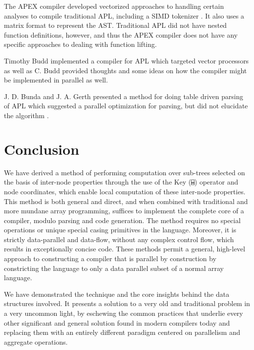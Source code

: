 ﻿\documentclass[numbers,10pt,preprint]{sigplanconf}
\begin{document}
The APEX compiler \cite{bernecky1997apex} developed vectorized approaches to handling certain analyses to compile traditional APL, including a SIMD tokenizer \cite{bernecky2003tokenizer}. It also uses a matrix format to represent the AST. Traditional APL did not have nested function definitions, however, and thus the APEX compiler does not have any specific approaches to dealing with function lifting.

Timothy Budd implemented a compiler \cite{budd1984apl,budd2012apl} for APL which targeted vector processors as well as C. Budd provided thoughts and some ideas on how the compiler might be implemented in parallel as well.

J. D. Bunda and J. A. Gerth presented a method for doing table driven parsing of APL which suggested a parallel optimization for parsing, but did not elucidate the algorithm \cite{bunda1984apl}.

\section{Conclusion}

We have derived a method of performing computation over sub-trees selected on the basis of inter-node properties through the use of the Key (\verb;⌸;) operator and node coordinates, which enable local computation of these inter-node properties. This method is both general and direct, and when combined with traditional and more mundane array programming, suffices to implement the complete core of a compiler, modulo parsing and code generation. The method requires no special operations or unique special casing primitives in the language. Moreover, it is strictly data-parallel and data-flow, without any complex control flow, which results in exceptionally concise code. These methods permit a general, high-level approach to constructing a compiler that is parallel by construction by constricting the language to only a data parallel subset of a normal array language.

We have demonstrated the technique and the core insights behind the data structures involved. It presents a solution to a very old and traditional problem in a very uncommon light, by eschewing the common practices that underlie every other significant and general solution found in modern compilers today and replacing them with an entirely different paradigm centered on parallelism and aggregate operations. 
\balancecolumns



\end{document}
